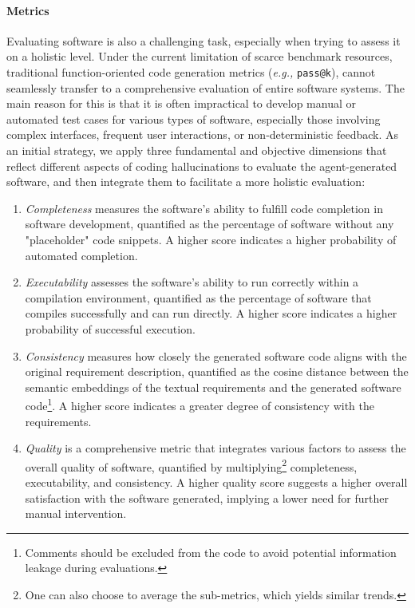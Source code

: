 \documentclass[11pt]{article}
\newcommand{\eg}{\textit{e.g., }}
\begin{document}
\noindent \paragraph{Metrics} Evaluating software is also a challenging task, especially when trying to assess it on a holistic level. 
Under the current limitation of scarce benchmark resources, traditional function-oriented code generation metrics (\eg \texttt{pass@k}), cannot seamlessly transfer to a comprehensive evaluation of entire software systems.
The main reason for this is that it is often impractical to develop manual or automated test cases for various types of software, especially those involving complex interfaces, frequent user interactions, or non-deterministic feedback.
As an initial strategy, we apply three fundamental and objective dimensions that reflect different aspects of coding hallucinations to evaluate the agent-generated software, and then integrate them to facilitate a more holistic evaluation:
\begin{enumerate}[$\bullet$]
\setlength{\topsep}{-4pt}
\setlength{\itemsep}{-4pt}
\item \textit{Completeness} measures the software's ability to fulfill code completion in software development, quantified as the percentage of software without any "placeholder" code snippets. A higher score indicates a higher probability of automated completion.
\item \textit{Executability} assesses the software's ability to run correctly within a compilation environment, quantified as the percentage of software that compiles successfully and can run directly. A higher score indicates a higher probability of successful execution.
\item \textit{Consistency} measures how closely the generated software code aligns with the original requirement description, quantified as the cosine distance between the semantic embeddings of the textual requirements and the generated software code\footnote{Comments should be excluded from the code to avoid potential information leakage during evaluations.}. A higher score indicates a greater degree of consistency with the requirements.
\item \textit{Quality} is a comprehensive metric that integrates various factors to assess the overall quality of software, quantified by multiplying\footnote{One can also choose to average the sub-metrics, which yields similar trends.} completeness, executability, and consistency. A higher quality score suggests a higher overall satisfaction with the software generated, implying a lower need for further manual intervention.
\end{enumerate}
\end{document}
